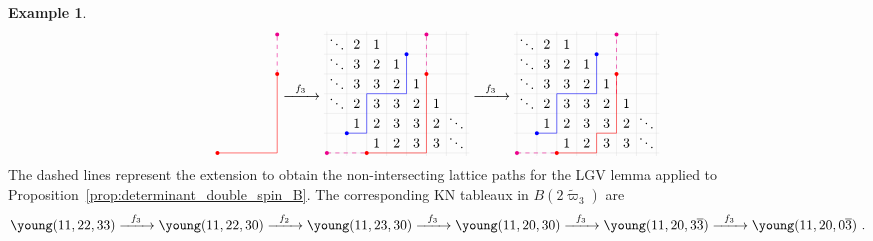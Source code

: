 \documentclass[11pt, leqno]{amsart}
\theoremstyle{plain}
\theoremstyle{definition}
\newtheorem{example}[theorem]{Example}
\numberwithin{equation}{section}
\newcommand{\fw}{\varpi} %
\newcommand{\tfw}{\widetilde{\fw}} %
\newcommand{\othree}{\overline{3}}
\begin{document}
\begin{example}
\begin{align*}
\begin{tikzpicture}[scale=0.5,baseline=-40]
\fill[magenta] (4.5,0.5) circle (0.1);
\draw[magenta,dashed] (4.5,-1.5) -- (4.5,0.5);
\fill[red] (1.5,-5.5) circle (0.1);
\fill[red] (4.5,-1.5) circle (0.1);
\draw[red] (1.5,-5.5) -- (4.5,-5.5) -- (4.5,-1.5);
\end{tikzpicture}
\xrightarrow[\hspace{20pt}]{f_3}
\begin{tikzpicture}[scale=0.5,baseline=-40]
\board
\fill[blue] (0.5,-4.5) circle (0.1);
\fill[blue] (3.5,-0.5) circle (0.1);
\draw[blue] (0.5,-4.5) -- (1.5,-4.5) -- (1.5,-2.5) -- (3.5,-2.5) -- (3.5,-0.5);
\fill[magenta] (-0.5,-5.5) circle (0.1);
\draw[magenta,dashed] (-0.5,-5.5) -- (1.5,-5.5);
\fill[magenta] (4.5,0.5) circle (0.1);
\draw[magenta,dashed] (4.5,-1.5) -- (4.5,0.5);
\fill[red] (1.5,-5.5) circle (0.1);
\fill[red] (4.5,-1.5) circle (0.1);
\draw[red] (1.5,-5.5) -- (4.5,-5.5) -- (4.5,-1.5);
\end{tikzpicture}
\xrightarrow[\hspace{20pt}]{f_3}
\begin{tikzpicture}[scale=0.5,baseline=-40]
\board
\fill[blue] (0.5,-4.5) circle (0.1);
\fill[blue] (3.5,-0.5) circle (0.1);
\draw[blue] (0.5,-4.5) -- (1.5,-4.5) -- (1.5,-2.5) -- (3.5,-2.5) -- (3.5,-0.5);
\fill[magenta] (-0.5,-5.5) circle (0.1);
\draw[magenta,dashed] (-0.5,-5.5) -- (1.5,-5.5);
\fill[magenta] (4.5,0.5) circle (0.1);
\draw[magenta,dashed] (4.5,-2.5) -- (4.5,0.5);
\fill[red] (1.5,-5.5) circle (0.1);
\fill[red] (4.5,-1.5) circle (0.1);
\draw[red] (1.5,-5.5) -- (3.5,-5.5) -- (3.5,-4.5) -- (4.5,-4.5) -- (4.5,-1.5);
\end{tikzpicture}
\end{align*}
The dashed lines represent the extension to obtain the non-intersecting lattice paths for the LGV lemma applied to Proposition~\ref{prop:determinant_double_spin_B}. The corresponding KN tableaux in $B(2\tfw_3)$ are
\[
\young(11,22,33)
\xrightarrow[\hspace{20pt}]{f_3} \young(11,22,30)
\xrightarrow[\hspace{20pt}]{f_2} \young(11,23,30)
\xrightarrow[\hspace{20pt}]{f_3} \young(11,20,30)
\xrightarrow[\hspace{20pt}]{f_3} \young(11,20,3\othree)
\xrightarrow[\hspace{20pt}]{f_3} \young(11,20,0\othree)\ .
\]
\end{example}
\end{document}
